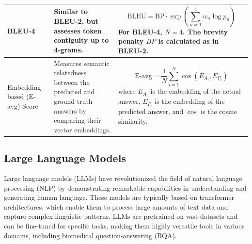 \documentclass[onecolumn, conference]{IEEEtran}
\begin{document}
\begin{table}[h]
\begin{tabular}{|l|p{4cm}|p{6cm}|}
    \hline
    BLEU-4                        & Similar to BLEU-2, but assesses token contiguity up to 4-grams.                                                                                                           & \[
      \text{BLEU} = \text{BP} \cdot \exp \left( \sum_{n=1}^{4} w_n \log p_n \right)
    \]
    For BLEU-4, \(N=4\). The brevity penalty \(BP\) is calculated as in BLEU-2.                                                                                                                                                   \\
    \hline
    Embedding-based (E-avg) Score & Measures semantic relatedness between the predicted and ground truth answers by comparing their vector embeddings.                                                        & \[
      \text{E-avg} = \frac{1}{N} \sum_{i=1}^{N} \cos(E_{A_i}, E_{P_i})
    \]
    where \(E_{A_i}\) is the embedding of the actual answer, \(E_{P_i}\) is the embedding of the predicted answer, and \(\cos\) is the cosine similarity.                                                                         \\
    \hline
  \end{tabular}
  \label{tab:metrics}
\end{table}

\subsection{Large Language Models}

Large language models (LLMs) have revolutionized the field of natural language processing (NLP) by demonstrating remarkable capabilities in understanding and generating human language. These models are typically based on transformer architectures, which enable them to process large amounts of text data and capture complex linguistic patterns. LLMs are pretrained on vast datasets and can be fine-tuned for specific tasks, making them highly versatile tools in various domains, including biomedical question-answering (BQA).
\end{document}
